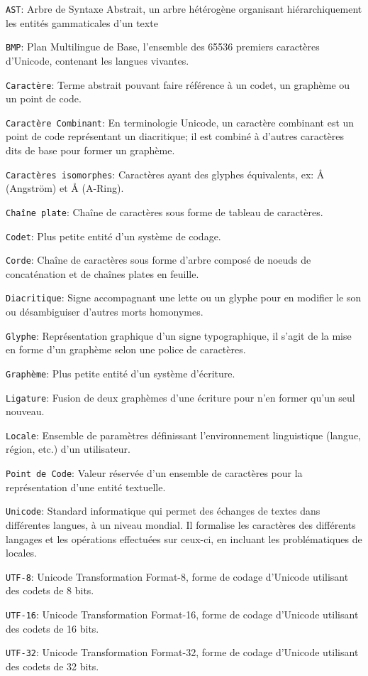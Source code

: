 \begin{lexique}
\texttt{AST}: Arbre de Syntaxe Abstrait, un arbre hétérogène organisant hiérarchiquement les entités gammaticales d’un texte

\texttt{BMP}: Plan Multilingue de Base, l'ensemble des 65536 premiers caractères d'Unicode, contenant les langues vivantes.

\texttt{Caractère}: Terme abstrait pouvant faire référence à un codet, un graphème ou un point de code.

\texttt{Caractère Combinant}: En terminologie Unicode, un caractère combinant est un point de code représentant un diacritique; il est combiné à d'autres caractères dits de base pour former un graphème.

\texttt{Caractères isomorphes}: Caractères ayant des glyphes équivalents, ex: Å (Angström) et Å (A-Ring).

\texttt{Chaîne plate}: Chaîne de caractères sous forme de tableau de caractères.

\texttt{Codet}: Plus petite entité d'un système de codage.

\texttt{Corde}: Chaîne de caractères sous forme d'arbre composé de noeuds de concaténation et de chaînes plates en feuille.

\texttt{Diacritique}: Signe accompagnant une lette ou un glyphe pour en modifier le son ou désambiguiser d'autres morts homonymes.

\texttt{Glyphe}: Représentation graphique d'un signe typographique, il s'agit de la mise en forme d'un graphème selon une police de caractères.

\texttt{Graphème}: Plus petite entité d'un système d'écriture.

\texttt{Ligature}: Fusion de deux graphèmes d’une écriture pour n’en former qu’un seul nouveau.

\texttt{Locale}: Ensemble de paramètres définissant l'environnement linguistique (langue, région, etc.) d'un utilisateur.

\texttt{Point de Code}: Valeur réservée d'un ensemble de caractères pour la représentation d'une entité textuelle.

\texttt{Unicode}: Standard informatique qui permet des échanges de textes dans différentes langues, à un niveau mondial. Il formalise les caractères des différents langages et les opérations effectuées sur ceux-ci, en incluant les problématiques de locales.

\texttt{UTF-8}: Unicode Transformation Format-8, forme de codage d'Unicode utilisant des codets de 8 bits.

\texttt{UTF-16}: Unicode Transformation Format-16, forme de codage d'Unicode utilisant des codets de 16 bits.

\texttt{UTF-32}: Unicode Transformation Format-32, forme de codage d'Unicode utilisant des codets de 32 bits.
\end{lexique}
